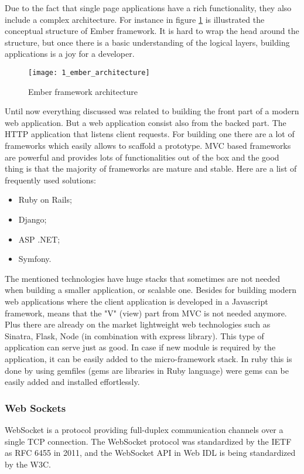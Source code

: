 Due to the fact that single page applications have a rich functionality, they also include a complex architecture. For instance in figure \mbox{\ref{ember_architecture}} is illustrated the conceptual structure of Ember framework. It is hard to wrap the head around the structure, but once there is a basic understanding of the logical layers, building applications is a joy for a developer.

\begin{figure}[!ht]
\centering
\texttt{[image: 1\_ember\_architecture]}
\caption{Ember framework architecture}\label{ember_architecture}
\end{figure}

Until now everything discussed was related to building the front part of a modern web application. But a web application consist also from the backed part. The HTTP application that listens client requests. For building one there are a lot of frameworks which easily allows to scaffold a prototype. MVC based frameworks are powerful and provides lots of functionalities out of the box and the good thing is that the majority of frameworks are mature and stable. Here are a list of frequently used solutions:
\begin{itemize}
    \item Ruby on Rails;
    \item Django;
    \item ASP .NET;
    \item Symfony.
\end{itemize}

The mentioned technologies have huge stacks that sometimes are not needed when building a smaller application, or scalable one. Besides for building modern web applications where the client application is developed in a Javascript framework, means that the "V" (view) part from MVC is not needed anymore. Plus there are already on the market lightweight web technologies such as Sinatra, Flask, Node (in combination with express library). This type of application can serve just as good. In case if new module is required by the application, it can be easily added to the micro-framework stack. In ruby this is done by using gemfiles (gems are libraries in Ruby language) were gems can be easily added and installed effortlessly.

\subsubsection{Web Sockets}
WebSocket is a protocol providing full-duplex communication channels over a single TCP connection. The WebSocket protocol was standardized by the IETF as RFC 6455 in 2011, and the WebSocket API in Web IDL is being standardized by the W3C.

